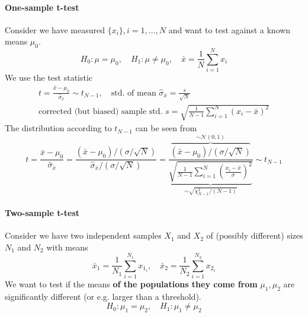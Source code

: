 \paragraph*{One-sample t-test} Consider we have measured $\{ x_i \}, i=1,\ldots,N$ and want to test against a known means $\mu_0$.
\begin{equation}
    H_0: \mu = \mu_0, \quad H_1: \mu \neq \mu_0, \quad \bar{x} = \frac{1}{N} \sum_{i=1}^N x_i
\end{equation}
We use the test statistic
\begin{equation}
    \begin{gathered}
        t = \frac{\bar{x} - \mu_0}{\hat{\sigma}_{\bar{x}}} \sim t_{N-1}, \quad \text{std. of mean } \hat{\sigma}_{\bar{x}} = \frac{s}{\sqrt{N}} \\
        \text{corrected (but biased) sample std. } s = \sqrt{\frac{1}{N-1} \sum_{i=1}^N (x_i - \bar{x})^2}
    \end{gathered}
\end{equation}
The distribution according to $t_{N-1}$ can be seen from
\begin{equation}
    t=\frac{\bar{x}-\mu_0}{\hat{\sigma}_{\bar{x}}}=\frac{\left(\bar{x}-\mu_0\right) /(\sigma / \sqrt{N})}{\hat{\sigma}_{\bar{x}} /(\sigma / \sqrt{N})}=\frac{\overbrace{\left(\bar{x}-\mu_0\right) /(\sigma / \sqrt{N})}^{\sim \mathcal{N}(0,1)}}{\underbrace{\sqrt{\frac{1}{N-1} \sum_{i=1}^N\left(\frac{x_i-\bar{x}}{\sigma}\right)^2}}_{\sim \sqrt{\chi_{N-1}^2 \slash (N-1)}}} \sim t_{N-1}
\end{equation}

\paragraph*{Two-sample t-test} Consider we have two independent samples $X_1$ and $X_2$ of (possibly different) sizes $N_1$ and $N_2$ with means
\begin{equation}
    \bar{x}_1 = \frac{1}{N_1} \sum_{i=1}^{N_1} x_{1_i}, \quad \bar{x}_2 = \frac{1}{N_2} \sum_{i=1}^{N_2} x_{2_i}
\end{equation}
We want to test if the means \textbf{of the populations they come from} $\mu_1, \mu_2$ are significantly different (or e.g. larger than a threshold).
\begin{equation}
    H_0: \mu_1 = \mu_2, \quad H_1: \mu_1 \neq \mu_2
\end{equation}

